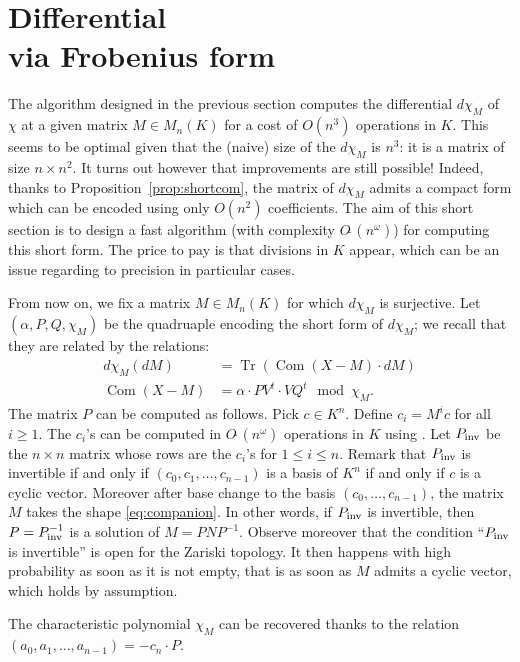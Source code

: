 \documentclass{sig-alternate-05-2015}
\DeclareMathOperator{\tr}{Tr}
\DeclareMathOperator{\com}{Com}
\newcommand{\softO}{O\tilde{~}}
\newcommand{\inv}{\text{\rm inv}}
\begin{document}
\section{Differential\\via Frobenius form}
\label{sec:diffFrob}

The algorithm designed in the previous section computes the differential 
$d \chi_M$ of $\chi$ at a given matrix $M \in M_n(K)$ for a cost of 
$O(n^3)$ operations in $K$. This seems to be optimal given that the 
(naive) size of the $d \chi_M$ is $n^3$: it is a matrix of size $n
\times n^2$. It turns out however that improvements are still possible!
Indeed, thanks to Proposition~\ref{prop:shortcom}, the matrix of 
$d \chi_M$ admits a compact form which can be encoded using only $O(n^2)$ 
coefficients. The aim of this short section is to design a fast 
algorithm (with complexity $\softO(n^\omega)$) for computing this short 
form. The price to pay is that divisions in $K$ appear, which can be an 
issue regarding to precision in particular cases.

From now on, we fix a matrix $M \in M_n(K)$ for which $d \chi_M$ is 
surjective. Let $(\alpha, P, Q, \chi_M)$ be the quadruaple encoding
the short form of $d \chi_M$; we recall that they are related by the
relations:
\begin{align*}
d \chi_M(dM) & =\tr(\com(X{-}M) \cdot dM) \\
\com(X{-}M) & = \alpha \cdot P V^t \cdot V Q^t \mod \chi_M.
\end{align*}
The matrix $P$ can be computed as follows. Pick $c \in K^n$. Define 
$c_i = M^i c$ for all $i \geq 1$. The $c_i$'s can be computed in 
$\softO(n^\omega)$ operations in $K$ using \cite{}. Let $P_\inv$ be the 
$n \times n$ matrix whose rows are the $c_i$'s for $1 \leq i \leq n$. 
Remark that $P_\inv$ is invertible if and only if $(c_0, c_1, \ldots, 
c_{n-1})$ is a basis of $K^n$ if and only if $c$ is a cyclic vector. 
Moreover after base change to the basis $(c_0, \ldots, c_{n-1})$, the matrix 
$M$ takes the shape \eqref{eq:companion}. In other words, if $P_\inv$
is invertible, then $P = P_\inv^{-1}$ is a solution of $M = P N P^{-1}$.
Observe moreover that the condition ``$P_\inv$ is invertible'' is open
for the Zariski topology. It then happens with high probability as soon
as it is not empty, that is as soon as $M$ admits a cyclic vector, which
holds by assumption.

The characteristic polynomial $\chi_M$ can be recovered thanks to the
relation $(a_0, a_1, \ldots, a_{n-1}) = -c_n \cdot P$.
\end{document}
